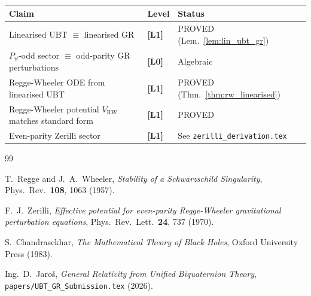 \documentclass[12pt,a4paper]{article}
\theoremstyle{definition}
\theoremstyle{remark}
\newcommand{\Lzero}{\textbf{[L0]}}
\newcommand{\Lone}{\textbf{[L1]}}
\begin{document}
\begin{center}
\begin{tabular}{lll}
\toprule
\textbf{Claim} & \textbf{Level} & \textbf{Status} \\
\midrule
Linearised UBT $\equiv$ linearised GR & \Lone & PROVED (Lem.~\ref{lem:lin_ubt_gr}) \\
$P_\psi$-odd sector $\equiv$ odd-parity GR perturbations & \Lzero & Algebraic \\
Regge-Wheeler ODE from linearised UBT & \Lone & PROVED (Thm.~\ref{thm:rw_linearised}) \\
Regge-Wheeler potential $V_{\mathrm{RW}}$ matches standard form & \Lone & PROVED \\
Even-parity Zerilli sector & \Lone & See \texttt{zerilli\_derivation.tex} \\
\bottomrule
\end{tabular}
\end{center}

\begin{thebibliography}{99}

  T.~Regge and J.~A.~Wheeler,
  \textit{Stability of a Schwarzschild Singularity},
  Phys.\ Rev.\ \textbf{108}, 1063 (1957).

  F.~J.~Zerilli,
  \textit{Effective potential for even-parity Regge-Wheeler gravitational
  perturbation equations},
  Phys.\ Rev.\ Lett.\ \textbf{24}, 737 (1970).

  S.~Chandrasekhar,
  \textit{The Mathematical Theory of Black Holes},
  Oxford University Press (1983).

  Ing.~D.~Jaroš,
  \textit{General Relativity from Unified Biquaternion Theory},
  \texttt{papers/UBT\_GR\_Submission.tex} (2026).

\end{thebibliography}

\ifdefined\INCLUDEMODE
\else
\end{document}
